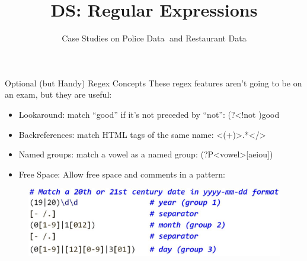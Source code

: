 \documentclass[aspectratio=169]{../latex_main/tntbeamer}  %
\title[Introduction]{DS: Regular Expressions}
\subtitle{Case Studies on Police Data and Restaurant Data}
\begin{document}
	
	\maketitle
	\begin{frame}{Optional (but Handy) Regex Concepts}
	    These regex features aren’t going to be on an exam, but they are useful:
	    \begin{itemize}
	        \item Lookaround: match “good” if it’s not preceded by “not”: (?<!not )good
	        \item Backreferences: match HTML tags of the same name: <(\w+)>.*</\1> 
	        \item Named groups: match a vowel as a named group: (?P<vowel>[aeiou])
	        \item Free Space: Allow free space and comments in a pattern:
	    \end{itemize}
	    \begin{figure}
	        \centering
	        \includegraphics[scale=.45]{Bild29}
	    \end{figure}
	\end{frame}
	
\end{document}

